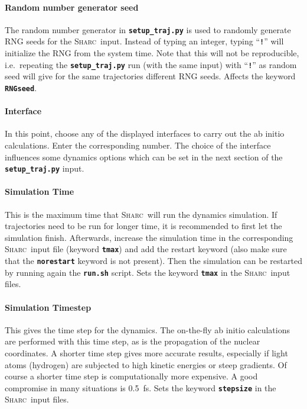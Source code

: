 \documentclass[a4paper,10pt,DIV=15,openany,twoside=false]{scrbook}
\newcommand{\sharc}{\textsc{Sharc}}
\newcommand{\ttt}[1]{\textbf{\texttt{#1}}}
\begin{document}
\paragraph{Random number generator seed}

The random number generator in \ttt{setup\_traj.py} is used to randomly generate RNG seeds for the \sharc\ input. Instead of typing an integer, typing ``\ttt{!}'' will initialize the RNG from the system time. Note that this will not be reproducible, i.e.\ repeating the \ttt{setup\_traj.py} run (with the same input) with ``\ttt{!}'' as random seed will give for the same trajectories different RNG seeds. Affects the keyword \ttt{RNGseed}.

\paragraph{Interface}

In this point, choose any of the displayed interfaces to carry out the ab initio calculations. Enter the corresponding number. The choice of the interface influences some dynamics options which can be set in the next section of the \ttt{setup\_traj.py} input.

\paragraph{Simulation Time}

This is the maximum time that \sharc\ will run the dynamics simulation. If trajectories need to be run for longer time, it is recommended to first let the simulation finish. Afterwards, increase the simulation time in the corresponding \sharc\ input file (keyword \ttt{tmax}) and add the restart keyword (also make sure that the \ttt{norestart} keyword is not present). Then the simulation can be restarted by running again the \ttt{run.sh} script. Sets the keyword \ttt{tmax} in the \sharc\ input files.

\paragraph{Simulation Timestep}

This gives the time step for the dynamics. The on-the-fly ab initio calculations are performed with this time step, as is the propagation of the nuclear coordinates. A shorter time step gives more accurate results, especially if light atoms (hydrogen) are subjected to high kinetic energies or steep gradients. Of course a shorter time step is computationally more expensive. A good compromise in many situations is 0.5~fs. Sets the keyword \ttt{stepsize} in the \sharc\ input files.
\end{document}
